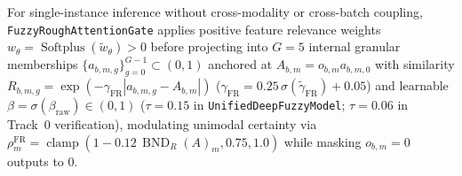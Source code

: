 \documentclass[10pt,twocolumn]{article}
\begin{document}
For single-instance inference without cross-modality or cross-batch coupling,
\texttt{FuzzyRough\allowbreak AttentionGate} applies positive feature relevance weights
$w_\theta = \operatorname{Softplus}(\tilde{w}_\theta) > 0$ before projecting into $G=5$
internal granular memberships $\{a_{b,m,g}\}_{g=0}^{G-1} \subset (0,1)$ anchored at $A_{b,m} =
o_{b,m} a_{b,m,0}$ with similarity $R_{b,m,g} = \exp(-\gamma_{\text{FR}}|a_{b,m,g}-A_{b,m}|)$
($\gamma_{\text{FR}} = 0.25\,\sigma(\tilde{\gamma}_{\text{FR}}) + 0.05$) and learnable $\beta =
\sigma(\beta_{\text{raw}}) \in (0,1)$ ($\tau = 0.15$ in \texttt{UnifiedDeepFuzzyModel}; $\tau =
0.06$ in Track~0 verification), modulating unimodal certainty via $\rho_m^{\text{FR}} =
\operatorname{clamp}(1 - 0.12\,\operatorname{BND}_R(A)_m, 0.75, 1.0)$ while masking $o_{b,m}=0$
outputs to $0$.
\end{document}

